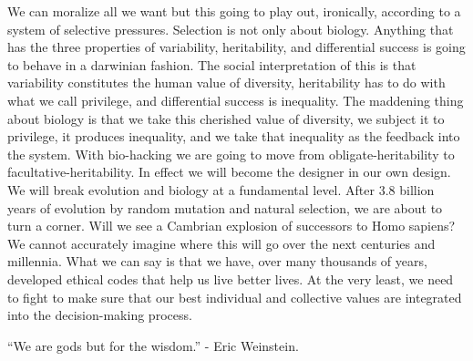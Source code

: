 We can moralize all we want but this going to play out, ironically, according to a system of selective pressures.
Selection is not only about biology.
Anything that has the three properties of variability, heritability, and differential success is going to behave in a darwinian fashion.
The social interpretation of this is that variability constitutes the human value of diversity, heritability has to do with what we call privilege, and differential success is inequality.
The maddening thing about biology is that we take this cherished value of diversity, we subject it to privilege, it produces inequality, and we take that inequality as the feedback into the system.
With bio-hacking we are going to move from obligate-heritability to facultative-heritability.
In effect we will become the designer in our own design.
We will break evolution and biology at a fundamental level.
After 3.8 billion years of evolution by random mutation and natural selection, we are about to turn a corner.
Will we see a Cambrian explosion of successors to Homo sapiens?
We cannot accurately imagine where this will go over the next centuries and millennia.
What we can say is that we have, over many thousands of years, developed ethical codes that help us live better lives.
At the very least, we need to fight to make sure that our best individual and collective values are integrated into the decision-making process.

\vfill
\hfill ``We are gods but for the wisdom.'' - Eric Weinstein.
